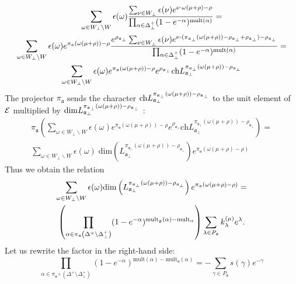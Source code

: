 \documentclass[a4paper,12pt]{article}
\theoremstyle{definition} \newtheorem{Def}{Definition}
\begin{document}
\begin{multline}
  \label{eq:14}
  \sum_{\omega\in W_{\bot}\backslash W} \epsilon(\omega) \frac{\sum_{\nu\in W_{\bot}}\epsilon(\nu) e^{\nu \cdot \omega(\mu+\rho)-\rho}}{\prod_{\alpha\in\Delta^{+}_{\bot}}(1-e^{-\alpha})^{\mathrm{mult}(\alpha)}} =\\
  \sum_{\omega\in W_{\bot}\backslash W} \epsilon(\omega) e^{\pi_{\mathfrak{a}}(\omega(\mu+\rho))-\rho} \frac{e^{\rho_{\mathfrak{a}_{\bot}} }\sum_{\nu\in W_{\bot}}\epsilon(\nu) e^{\nu \cdot (\pi_{\mathfrak{a}_{\bot}}(\omega(\mu+\rho))-\rho_{\mathfrak{a}_{\bot}}+\rho_{\mathfrak{a}_{\bot}})-\rho_{\mathfrak{a}_{\bot}}}}{\prod_{\alpha\in\Delta^{+}_{\bot}}(1-e^{-\alpha})^{\mathrm{mult}(\alpha)}}=\\
  \sum_{\omega\in W_{\bot}\backslash W} \epsilon(\omega) e^{\pi_{\mathfrak{a}}(\omega(\mu+\rho))-\rho}e^{\rho_{\mathfrak{a}_{\bot}}} {\rm ch} L^{\pi_{\mathfrak{a}_{\bot}}(\omega(\mu+\rho))-\rho_{\mathfrak{a}_{\bot}}}_{\mathfrak{a}_{\bot}}
\end{multline}
The projector $\pi_{\mathfrak{a}}$ sends the character ${\rm ch}L^{\pi_{\mathfrak{a}_{\bot}}(\omega(\mu+\rho))-\rho_{\mathfrak{a}_{\bot}}}_{\mathfrak{a}_{\bot}}$ to the unit element of $\cal{E}$ multiplied by ${\rm dim}L^{\pi_{\mathfrak{a}_{\bot}}(\omega(\mu+\rho))-\rho_{\mathfrak{a}_{\bot}}}_{\mathfrak{a}_{\bot}}$  :
  \begin{multline}
    \label{eq:15}
    \pi_{\mathfrak{a}}\left( \sum_{\omega\in W_{\bot}\backslash W} \epsilon(\omega) e^{\pi_{\mathfrak{a}}(\omega(\mu+\rho))-\rho}e^{\rho_{\mathfrak{a}_{\bot}}} \mathrm{ch} L^{\pi_{\mathfrak{a}_{\bot}}(\omega(\mu+\rho))-\rho_{\mathfrak{a}_{\bot}}}_{\mathfrak{a}_{\bot}}\right) = \\
    \sum_{\omega\in W_{\bot}\backslash W} \epsilon(\omega)\; \mathrm{dim}\left(L^{\pi_{\mathfrak{a}_{\bot}}(\omega(\mu+\rho))-\rho_{\mathfrak{a}_{\bot}}}_{\mathfrak{a}_{\bot}}\right) e^{\pi_{\mathfrak{a}}(\omega(\mu+\rho)-\rho)}
  \end{multline}
Thus we obtain the relation
\begin{multline}
  \label{eq:9}
  \sum_{\omega\in W_{\bot}\backslash W} \epsilon(\omega) \mathrm{dim}\left(L^{\pi_{\mathfrak{a}_{\bot}}(\omega(\mu+\rho))-\rho_{\mathfrak{a}_{\bot}}}_{\mathfrak{a}_{\bot}}\right) e^{\pi_{\mathfrak{a}}(\omega(\mu+\rho)-\rho)}=\\
  \left(\prod_{\alpha\in \pi_{\mathfrak{a}}\left(\Delta^{+}\setminus \Delta^{+}_{\bot}\right)}(1-e^{-\alpha})^{{\rm mult}_{\mathfrak{g}}(\alpha)-{\rm mult}_{\mathfrak{\alpha}}} \right)
  \sum_{\lambda \in P_{\frak{a}}}k_{\lambda}^{\left( \mu \right) }e^{\lambda }.
\end{multline}
Let us rewrite the factor in the right-hand side:
\begin{equation}
  \label{eq:11}
    \prod_{\alpha\in \pi_{\mathfrak{a}}\circ (\Delta^{+}\setminus \Delta^{+}_{\bot})} \left(1-e^{-\alpha}\right)^{\mathrm{mult}(\alpha)-\mathrm{mult}_{\mathfrak{a}}(\alpha)}=
     -\sum_{\gamma\in P_{\mathfrak{a}}} s(\gamma)e^{-\gamma}
\end{equation}
\end{document}
